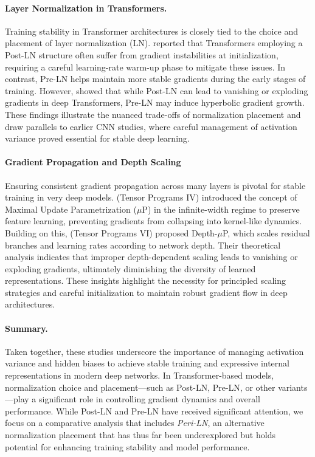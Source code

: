\paragraph{Layer Normalization in Transformers.}
Training stability in Transformer architectures is closely tied to the choice and placement of layer normalization (LN). \citet{onlayer} reported that Transformers employing a Post-LN structure often suffer from gradient instabilities at initialization, requiring a careful learning-rate warm-up phase to mitigate these issues. In contrast, Pre-LN helps maintain more stable gradients during the early stages of training. However, \citet{transformersgetstable} showed that while Post-LN can lead to vanishing or exploding gradients in deep Transformers, Pre-LN may induce hyperbolic gradient growth. These findings illustrate the nuanced trade-offs of normalization placement and draw parallels to earlier CNN studies, where careful management of activation variance proved essential for stable deep learning.

\paragraph{Gradient Propagation and Depth Scaling}
Ensuring consistent gradient propagation across many layers is pivotal for stable training in very deep models. \citet{tensorprogram4} (Tensor Programs IV) introduced the concept of Maximal Update Parametrization ($\mu$P) in the infinite-width regime to preserve feature learning, preventing gradients from collapsing into kernel-like dynamics. Building on this, \citet{tensorprogram6} (Tensor Programs VI) proposed Depth-$\mu$P, which scales residual branches and learning rates according to network depth. Their theoretical analysis indicates that improper depth-dependent scaling leads to vanishing or exploding gradients, ultimately diminishing the diversity of learned representations. These insights highlight the necessity for principled scaling strategies and careful initialization to maintain robust gradient flow in deep architectures.

\smallskip
\noindent
\paragraph{Summary.}
Taken together, these studies underscore the importance of managing activation variance and hidden biases to achieve stable training and expressive internal representations in modern deep networks. In Transformer-based models, normalization choice and placement---such as Post-LN, Pre-LN, or other variants---play a significant role in controlling gradient dynamics and overall performance. While Post-LN and Pre-LN have received significant attention, we focus on a comparative analysis that includes \textit{Peri-LN}, an alternative normalization placement that has thus far been underexplored but holds potential for enhancing training stability and model performance.


